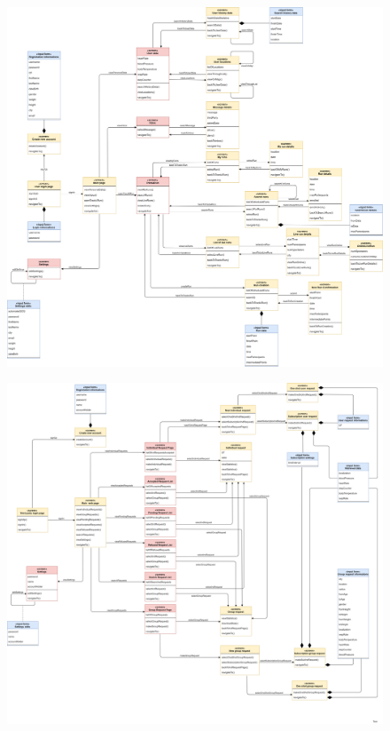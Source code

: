 \begin{figure}[H]
    \centering
    \includegraphics[width=1\textwidth]{./Pictures/UXMobile.png}
    
\end{figure}

\begin{figure}[H]
    \centering
    \includegraphics[width=1\textwidth]{DD/Pictures/UXWeb.png}
    
\end{figure}